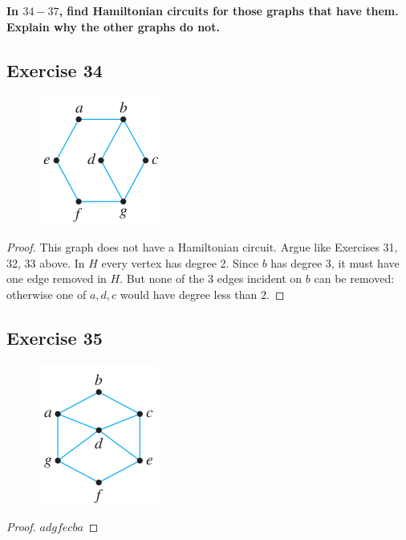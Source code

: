 \documentclass[14pt]{extarticle}
\newcommand{\cy}{\color{cyan}}
\begin{document}
{\bf \cy In $34-37$, find Hamiltonian circuits for those graphs that have them. Explain why the other graphs do not.}

\subsection{Exercise 34}
\begin{figure}[ht!]
    \centering
    \includegraphics[scale=0.8]{../images/10.1.34.png}
\end{figure}

\begin{proof}
    This graph does not have a Hamiltonian circuit. Argue like Exercises 31, 32, 33 above. In \(H\) every vertex has degree
    2. Since \(b\) has degree 3, it must have one edge removed in \(H\). But none of the 3 edges incident on \(b\) can be
    removed: otherwise one of \(a,d,c\) would have degree less than 2.
\end{proof}

\subsection{Exercise 35}
\begin{figure}[ht!]
    \centering
    \includegraphics[scale=0.7]{../images/10.1.35.png}
\end{figure}

\begin{proof}
    \(adgfecba\)
\end{proof}
\end{document}
